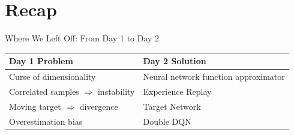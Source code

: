 \section{Recap}
\begin{frame}{Where We Left Off: From Day 1 to Day 2}
    \begin{table}[]
        \centering
        \renewcommand{\arraystretch}{2.0}
        \begin{tabular}{>{\raggedright\arraybackslash}p{4.5cm} >{\raggedright\arraybackslash}p{5.5cm}}
            \hline
            \textbf{Day 1 Problem} & \textbf{Day 2 Solution} \\
            \hline
            Curse of dimensionality & Neural network function approximator \\
            Correlated samples $\Rightarrow$ instability & Experience Replay \\
            Moving target $\Rightarrow$ divergence & Target Network \\
            Overestimation bias & Double DQN \\
            \hline
        \end{tabular}
    \end{table}
\end{frame}